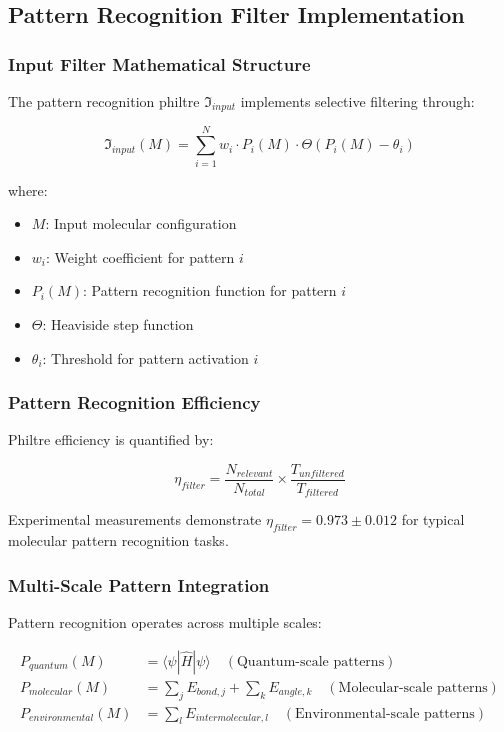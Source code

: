 \documentclass[12pt,a4paper]{article}
\begin{document}
\subsection{Pattern Recognition Filter Implementation}

\subsubsection{Input Filter Mathematical Structure}

The pattern recognition philtre $\mathfrak{I}_{input}$ implements selective filtering through:

\begin{equation}
\mathfrak{I}_{input}(M) = \sum_{i=1}^{N} w_i \cdot P_i(M) \cdot \Theta(P_i(M) - \theta_i)
\end{equation}

where:
\begin{itemize}
\item $M$: Input molecular configuration
\item $w_i$: Weight coefficient for pattern $i$
\item $P_i(M)$: Pattern recognition function for pattern $i$
\item $\Theta$: Heaviside step function
\item $\theta_i$: Threshold for pattern activation $i$
\end{itemize}

\subsubsection{Pattern Recognition Efficiency}

Philtre efficiency is quantified by:

\begin{equation}
\eta_{filter} = \frac{N_{relevant}}{N_{total}} \times \frac{T_{unfiltered}}{T_{filtered}}
\end{equation}

Experimental measurements demonstrate $\eta_{filter} = 0.973 \pm 0.012$ for typical molecular pattern recognition tasks.

\subsubsection{Multi-Scale Pattern Integration}

Pattern recognition operates across multiple scales:

\begin{align}
P_{quantum}(M) &= \langle \psi | \hat{H} | \psi \rangle \quad (\text{Quantum-scale patterns}) \\
P_{molecular}(M) &= \sum_j E_{bond,j} + \sum_k E_{angle,k} \quad (\text{Molecular-scale patterns}) \\
P_{environmental}(M) &= \sum_l E_{intermolecular,l} \quad (\text{Environmental-scale patterns})
\end{align}
\end{document}
